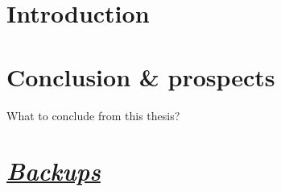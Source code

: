 \documentclass[10pt,aspectratio=169]{beamer}
\newcounter{totalframes}
\begin{document}
\subsection*{}
\section*{Introduction}





\subsection*{}
\section*{Conclusion \& prospects}
\begin{frame}
\begin{center}
\Large What to conclude from this thesis?
\end{center}
\end{frame}


\begin{frame}\thispagestyle{empty}
\begin{center}
{\large \color{CERNblue}{Merci pour votre attention !}}

\vspace{.25\textheight}
\end{center}
\end{frame}

\setcounter{totalframes}{\theframenumber}
\subsection*{}
\section*{\hyperlink{backups}{\emph{Backups}}}


\setcounter{framenumber}{\thetotalframes}
\end{document}

